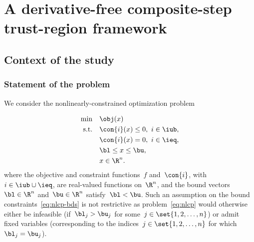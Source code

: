 \chapter{A derivative-free composite-step trust-region  framework}

\section{Context of the study}

\subsection{Statement of the problem}

We consider the nonlinearly-constrained optimization problem

\begin{subequations}
    \label{eq:nlcp}
    \begin{align}
        \min        & \quad \obj(x) \label{eq:nlcp-obj}\\
        \text{s.t.} & \quad \con{i}(x) \le 0, ~ i \in \iub, \label{eq:nlcp-cub}\\
                    & \quad \con{i}(x) = 0, ~ i \in \ieq, \label{eq:nlcp-ceq}\\
                    & \quad \bl \le x \le \bu, \label{eq:nlcp-bds}\\
                    & \quad x \in \R^n. \nonumber
    \end{align}
\end{subequations}
%
%
%
%
where the objective and constraint functions~$f$ and~$\con{i}$, with~$i \in \iub \cup \ieq$, are real-valued functions on~$\R^n$, and the bound vectors~$\bl \in \R^n$ and~$\bu \in \R^n$ satisfy~$\bl < \bu$.
Such an assumption on the bound constraints~\eqref{eq:nlcp-bds} is not restrictive as problem~\eqref{eq:nlcp} would otherwise either be infeasible (if~$\bl_j > \bu_j$ for some~$j \in \set{1, 2, \dots, n}$) or admit fixed variables (corresponding to the indices~$j \in \set{1, 2, \dots, n}$ for which~$\bl_j = \bu_j$).

